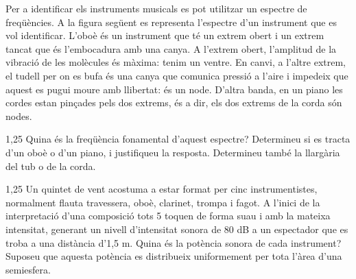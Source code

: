 Per a identificar els instruments musicals es pot utilitzar un espectre de freqüències. A la figura següent es representa l'espectre d'un instrument que es vol identificar. L'oboè és un instrument que té un extrem obert i un extrem tancat que és l'embocadura amb una canya. A l'extrem obert, l'amplitud de la vibració de les molècules és màxima: tenim un ventre. En canvi, a l'altre extrem, el tudell per on es bufa és una canya que comunica pressió a l'aire i impedeix que aquest es pugui moure amb llibertat: és un node. D'altra banda, en un piano les cordes estan pinçades pels dos extrems, és a dir, els dos extrems de la corda són nodes.


\begin{apartat}{1,25}
Quina és la freqüència fonamental d'aquest espectre? Determineu si es tracta d'un oboè o d'un piano, i justifiqueu la resposta. Determineu també la llargària del tub o de la corda.
\end{apartat}

\begin{apartat}{1,25}
Un quintet de vent acostuma a estar format per cinc instrumentistes, normalment flauta travessera, oboè, clarinet, trompa i fagot. A l'inici de la interpretació d'una composició tots 5 toquen de forma suau i amb la mateixa intensitat, generant un nivell d'intensitat sonora de 80 dB a un espectador que es troba a una distància d'1,5 m. Quina és la potència sonora de cada instrument? Suposeu que aquesta potència es distribueix uniformement per tota l'àrea d'una semiesfera.
\end{apartat}

